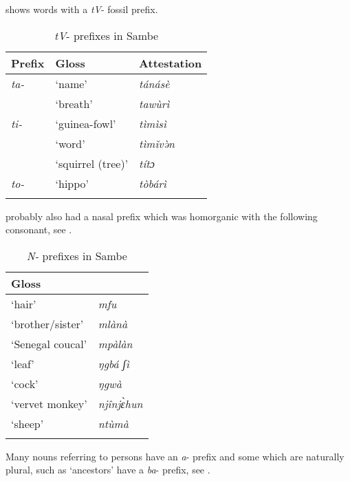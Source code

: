 \documentclass[output=paper]{langsci/langscibook}
\begin{document}
\newpage 
{} shows words with a \textit{tV}- fossil prefix.

\begin{table}
\caption{\label{tab:nomaffplat:16} \textit{tV}-  prefixes in Sambe}
\begin{tabularx}{\textwidth}{XXX}
\lsptoprule
  Prefix 	& Gloss 	&   Attestation\\
\midrule
\itshape ta- 	& ‘name’ 	&  \itshape tánásè\\
	     	& ‘breath’ 	&  \itshape tawùrì \\
\tablevspace
\itshape ti- 	& ‘guinea-fowl’ 	&  \itshape tìmìsì\\
	      	& ‘word’ 	&  \itshape tìmǐvə̀n\\
	      	& ‘squirrel (tree)’ 	&  \itshape títɔ\\
\tablevspace
\itshape to- 	& ‘hippo’ 	&  \itshape tòbárì\\
\lspbottomrule
\end{tabularx}
\end{table}


 probably also had a nasal prefix which was homorganic with the following consonant, see .

\begin{table}
\caption{\textit{N-} prefixes in Sambe}
    \label{extab:nomaffplat:46} 

\begin{tabularx}{\textwidth}{XX}
\lsptoprule
Gloss 	&    \ilit{Sambe}\\
\midrule
‘hair’ 	&  \itshape mfu\\
‘brother/sister’ 	&  \itshape mlànà\\
‘Senegal coucal’ 	&  \itshape mpàlàn\\
‘leaf’ 	&  \itshape ŋgbá ʃì\\
‘cock’ 	&  \itshape ŋgwà\\
‘vervet monkey’ 	&  \itshape njînjɛ̀hun\\
‘sheep’ 	&  \itshape ntùmà\\
\lspbottomrule
\end{tabularx}
\end{table}


Many nouns referring to persons have an \textit{a}- prefix and some which are naturally plural, such as ‘ancestors’ have a \textit{ba}- prefix, see .
\end{document}
